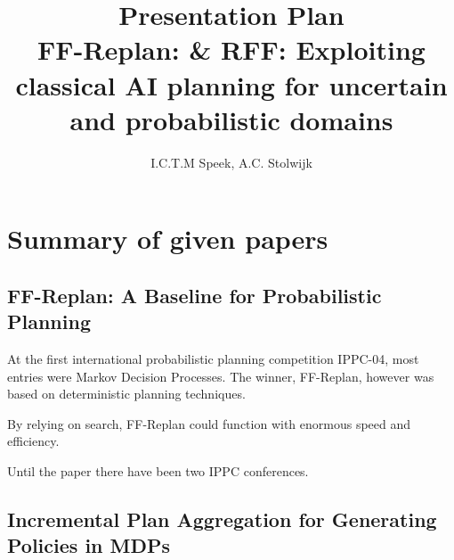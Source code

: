 \documentclass[runningheads,a4paper]{llncs}
\begin{document}
\mainmatter%

\title{Presentation Plan\\
FF-Replan: \& RFF\@: Exploiting classical AI planning for uncertain and probabilistic domains}


\author{I.C.T.M Speek, A.C. Stolwijk}

%


\maketitle

\section{Summary of given papers}

\subsection{FF-Replan: A Baseline for Probabilistic Planning}

At the first international probabilistic planning competition IPPC-04, most
entries were Markov Decision Processes. The winner, FF-Replan, however was
based on deterministic planning techniques.

By relying on search, FF-Replan could function with enormous speed and efficiency.

Until the paper there have been two IPPC conferences.

\subsection{Incremental Plan Aggregation for Generating Policies in MDPs}
\end{document}
